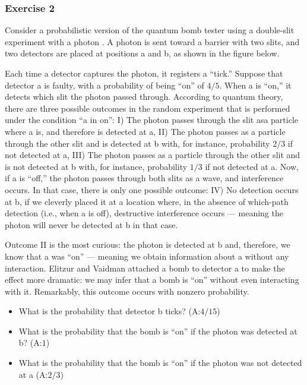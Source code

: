 \documentclass[
]{book}
\begin{document}
\hypertarget{exercise-2-1}{%
\subsubsection{Exercise 2}\label{exercise-2-1}}

Consider a probabilistic version of the quantum bomb tester using a double-slit experiment with a photon \citep{Elitzur1993}. A photon is sent toward a barrier with two slits, and two detectors are placed at positions a and b, as shown in the figure below.

Each time a detector captures the photon, it registers a ``tick.'' Suppose that detector a is faulty, with a probability of being ``on'' of \(4/5\). When a is ``on,'' it detects which slit the photon passed through. According to quantum theory, there are three possible outcomes in the random experiment that is performed under the condition ``a in on'': I) The photon passes through the slit asa particle where a is, and therefore is detected at a, II) The photon passes as a particle through the other slit and is detected at b with, for instance, probability \(2/3\) if not detected at a, III) The photon passes as a particle through the other slit and is not detected at b with, for instance, probability \(1/3\) if not detected at a. Now, if a is ``off,'' the photon passes through both slits as a wave, and interference occurs. In that case, there is only one possible outcome: IV) No detection occurs at b, if we cleverly placed it at a location where, in the absence of which-path detection (i.e., when a is off), destructive interference occurs --- meaning the photon will never be detected at b in that case.

Outcome II is the most curious: the photon is detected at b and, therefore, we know that a was ``on'' --- meaning we obtain information about a without any interaction. Elitzur and Vaidman attached a bomb to detector a to make the effect more dramatic: we may infer that a bomb is ``on'' without even interacting with it. Remarkably, this outcome occurs with nonzero probability.

\begin{itemize}
\item
  What is the probability that detector b ticks? (A:\(4/15\))
\item
  What is the probability that the bomb is ``on'' if the photon was detected at b? (A:\(1\))
\item
  What is the probability that the bomb is ``on'' if the photon was not detected at a (A:\(2/3\))
\end{itemize}
\end{document}
